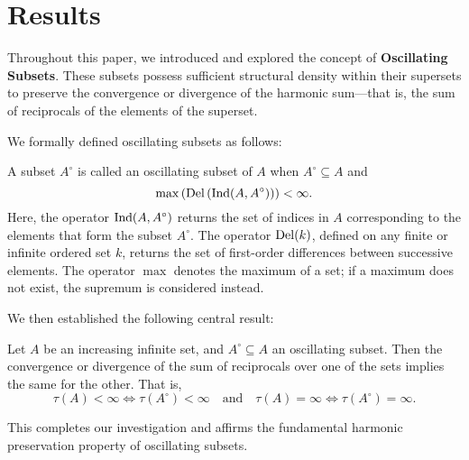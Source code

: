 \section{Results}

Throughout this paper, we introduced and explored the concept of \textbf{Oscillating Subsets}. These subsets possess sufficient structural density within their supersets to preserve the convergence or divergence of the harmonic sum—that is, the sum of reciprocals of the elements of the superset.

We formally defined oscillating subsets as follows:

\begin{result}
A subset $A^\circ$ is called an oscillating subset of $A$ when $A^\circ \subseteq A$ and
\[
\max \left( \operatorname{Del}\left( \operatorname{Ind}(A, A^\circ) \right) \right) < \infty.
\]
Here, the operator $\operatorname{Ind}(A, A^\circ)$ returns the set of indices in $A$ corresponding to the elements that form the subset $A^\circ$. The operator $\operatorname{Del}(k)$, defined on any finite or infinite ordered set $k$, returns the set of first-order differences between successive elements. The operator $\max$ denotes the maximum of a set; if a maximum does not exist, the supremum is considered instead.
\end{result}

We then established the following central result:

\begin{result}
Let $A$ be an increasing infinite set, and $A^\circ \subseteq A$ an oscillating subset. Then the convergence or divergence of the sum of reciprocals over one of the sets implies the same for the other. That is,
\[
\tau(A) < \infty \iff \tau(A^\circ) < \infty \quad \text{and} \quad \tau(A) = \infty \iff \tau(A^\circ) = \infty.
\]
\end{result}

This completes our investigation and affirms the fundamental harmonic preservation property of oscillating subsets.
